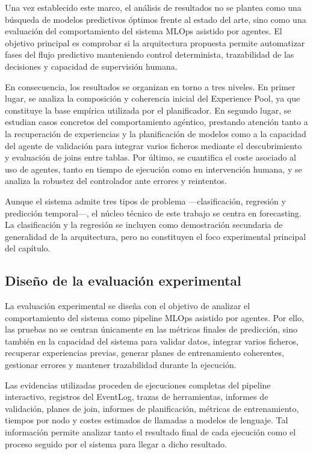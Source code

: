 \documentclass[12pt,a4paper]{article}
\theoremstyle{plain}
\begin{document}
Una vez establecido este marco, el análisis de resultados no se plantea como una búsqueda de modelos predictivos óptimos frente al estado del arte, sino como una evaluación del comportamiento del sistema MLOps asistido por agentes. El objetivo principal es comprobar si la arquitectura propuesta permite automatizar fases del flujo predictivo manteniendo control determinista, trazabilidad de las decisiones y capacidad de supervisión humana.

En consecuencia, los resultados se organizan en torno a tres niveles. En primer lugar, se analiza la composición y coherencia inicial del Experience Pool, ya que constituye la base empírica utilizada por el planificador. En segundo lugar, se estudian casos concretos del comportamiento agéntico, prestando atención tanto a la recuperación de experiencias y la planificación de modelos como a la capacidad del agente de validación para integrar varios ficheros mediante el descubrimiento y evaluación de joins entre tablas. Por último, se cuantifica el coste asociado al uso de agentes, tanto en tiempo de ejecución como en intervención humana, y se analiza la robustez del controlador ante errores y reintentos.

Aunque el sistema admite tres tipos de problema —clasificación, regresión y predicción temporal—, el núcleo técnico de este trabajo se centra en forecasting. La clasificación y la regresión se incluyen como demostración secundaria de generalidad de la arquitectura, pero no constituyen el foco experimental principal del capítulo.

\subsection{Diseño de la evaluación experimental}
\label{sec:diseno-evaluacion-resultados}

La evaluación experimental se diseña con el objetivo de analizar el comportamiento del sistema como pipeline MLOps asistido por agentes. Por ello, las pruebas no se centran únicamente en las métricas finales de predicción, sino también en la capacidad del sistema para validar datos, integrar varios ficheros, recuperar experiencias previas, generar planes de entrenamiento coherentes, gestionar errores y mantener trazabilidad durante la ejecución.

Las evidencias utilizadas proceden de ejecuciones completas del pipeline interactivo, registros del EventLog, trazas de herramientas, informes de validación, planes de join, informes de planificación, métricas de entrenamiento, tiempos por nodo y costes estimados de llamadas a modelos de lenguaje. Tal información permite analizar tanto el resultado final de cada ejecución como el proceso seguido por el sistema para llegar a dicho resultado.
\end{document}
